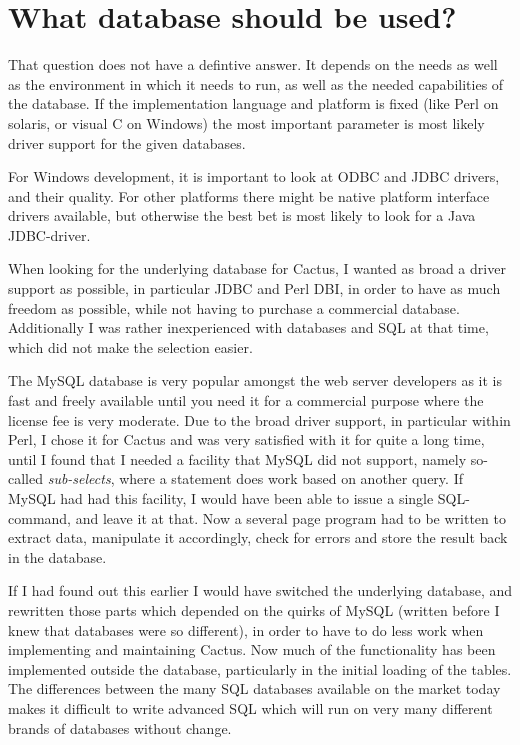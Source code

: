 \section{What database should be used?}

That question does not have a defintive answer.  It depends on the
needs as well as the environment in which it needs to run, as well as
the needed capabilities of the database.  If the implementation
language and platform is fixed (like Perl on solaris, or visual C on
Windows) the most important parameter is most likely driver support
for the given databases.

For Windows development, it is important to look at ODBC and JDBC
drivers, and their quality.  For other platforms there might be native
platform interface drivers available, but otherwise the best bet is
most likely to look for a Java JDBC-driver.

When looking for the underlying database for Cactus, I wanted as broad
a driver support as possible, in particular JDBC and Perl DBI, in
order to have as much freedom as possible, while not having to
purchase a commercial database.  Additionally I was rather
inexperienced with databases and SQL at that time, which did not make
the selection easier.

The MySQL database is very popular amongst the web server developers
as it is fast and freely available until you need it for a commercial
purpose where the license fee is very moderate.   Due to the broad
driver support, in particular within Perl, I chose it for Cactus and
was very satisfied with it for quite a long time, until I found that I
needed a facility that MySQL did not support, namely so-called
\textit{sub-selects}, where a statement does work based on another
query.   If MySQL had had this facility, I would have been able to
issue a single SQL-command, and leave it at that.  Now a several page
program had to be written to extract data, manipulate it accordingly,
check for errors and store the result back in the database.

If I had found out this earlier I would have switched the underlying
database, and rewritten those parts which depended on the quirks of
MySQL (written before I knew that databases were so different), in
order to have to do less work when implementing and maintaining
Cactus.  Now much of the functionality has been implemented outside
the database, particularly in the initial loading of the tables.  The
differences between the many SQL databases available on the market
today makes it difficult to write advanced SQL which will run on very
many different brands of databases without change.

